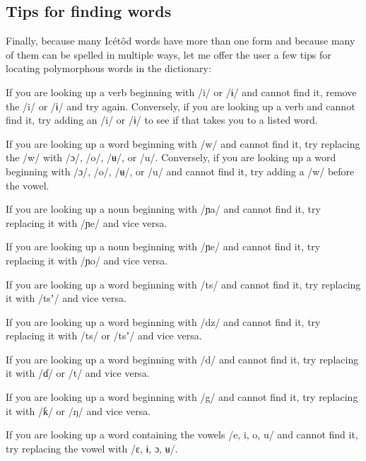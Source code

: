 \subsection{Tips for finding words}

Finally, because many Icétôd words have more than one form and because many of them can be spelled in multiple ways, let me offer the user a few tips for locating polymorphous words in the dictionary:


\item 
If you are looking up a verb beginning with /i/ or /ɨ/ and cannot find it, remove the /i/ or /ɨ/ and try again. Conversely, if you are looking up a verb and cannot find it, try adding an /i/ or /ɨ/ to see if that takes you to a listed word. 
\item 
If you are looking up a word beginning with /w/ and cannot find it, try replacing the /w/ with /ɔ/, /o/, /ʉ/, or /u/. Conversely, if you are looking up a word beginning with /ɔ/, /o/, /ʉ/, or /u/ and cannot find it, try adding a /w/ before the vowel. 
\item 
If you are looking up a noun beginning with /ɲa/ and cannot find it, try replacing it with /ɲe/ and vice versa. 
\item 
If you are looking up a noun beginning with /ɲe/ and cannot find it, try replacing it with /ɲo/ and vice versa. 
\item 
If you are looking up a word beginning with /ts/ and cannot find it, try replacing it with /tsʼ/ and vice versa. 
\item 
If you are looking up a word beginning with /dz/ and cannot find it, try replacing it with /ts/ or /tsʼ/ and vice versa. 
\item 
If you are looking up a word beginning with /d/ and cannot find it, try replacing it with /ɗ/ or /t/ and vice versa. 
\item 
If you are looking up a word beginning with /g/ and cannot find it, try replacing it with /ƙ/ or /ŋ/ and vice versa. 
\item 
If you are looking up a word containing the vowels /e, i, o, u/ and cannot find it, try replacing the vowel with /ɛ, ɨ, ɔ, ʉ/.
 